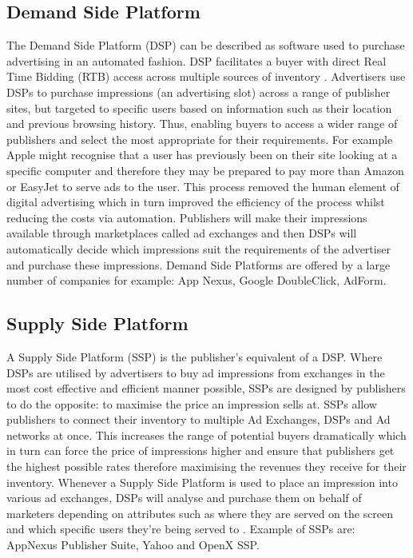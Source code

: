\documentclass[12pt]{article}
\begin{document}
\subsection{Demand Side Platform} \label{DSP}
The Demand Side Platform (DSP) can be described as software used to purchase advertising in an automated fashion. DSP facilitates a buyer with direct Real Time Bidding (RTB) access across multiple sources of inventory \parencite{introDSP}. Advertisers use DSPs to purchase impressions (an advertising slot) across a range of publisher sites, but targeted to specific users based on information such as their location and previous browsing history. Thus, enabling buyers to access a wider range of publishers and select the most appropriate for their requirements. For example Apple might recognise that a user has previously been on their site looking at a specific computer and therefore they may be prepared to pay more than Amazon or EasyJet to serve ads to the user. This process removed the human element of digital advertising which in turn improved the efficiency of the process whilst reducing the costs via automation. Publishers will make their impressions available through marketplaces called ad exchanges and then DSPs will automatically decide which impressions suit the requirements of the advertiser and purchase these impressions. Demand Side Platforms are offered by a large number of companies for example: App Nexus, Google DoubleClick, AdForm. 

\subsection{Supply Side Platform} \label{SSP}
A Supply Side Platform (SSP) is the publisher's equivalent of a DSP. Where DSPs are utilised by advertisers to buy ad impressions from exchanges in the most cost effective and efficient manner possible, SSPs are designed by publishers to do the opposite: to maximise the price an impression sells at. SSPs allow publishers to connect their inventory to multiple Ad Exchanges, DSPs and Ad networks at once. This increases the range of potential buyers dramatically which in turn can force the price of impressions higher and ensure that publishers get the highest possible rates therefore maximising the revenues they receive for their inventory. Whenever a Supply Side Platform is used to place an impression into various ad exchanges, DSPs will analyse and purchase them on behalf of marketers depending on attributes such as where they are served on the screen and which specific users they're being served to \parencite{introDSP}. Example of SSPs are: AppNexus Publisher Suite, Yahoo and OpenX SSP.  
\end{document}
